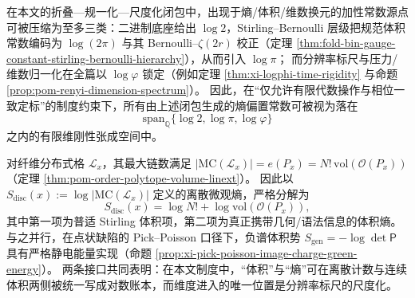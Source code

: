 \begin{remark}\label{rem:xi-constant-source-span-log2-pi-phi}
在本文的折叠—规一化—尺度化闭包中，出现于熵/体积/维数换元的加性常数源点可被压缩为至多三类：二进制底座给出 \(\log 2\)，Stirling--Bernoulli 层级把规范体积常数编码为 \(\log(2\pi)\) 与其 Bernoulli--\(\zeta(2r)\) 校正（定理 \ref{thm:fold-bin-gauge-constant-stirling-bernoulli-hierarchy}），从而引入 \(\log\pi\)；
而分辨率标尺与压力/维数归一化在全篇以 \(\log\varphi\) 锁定（例如定理 \ref{thm:xi-logphi-time-rigidity} 与命题 \ref{prop:pom-renyi-dimension-spectrum}）。
因此，在“仅允许有限代数操作与相位一致定标”的制度约束下，所有由上述闭包生成的熵偏置常数可被视为落在
\[
\mathrm{span}_{\mathbb Q}\{\log 2,\log\pi,\log\varphi\}
\]
之内的有限维刚性张成空间中。
\end{remark}

\begin{remark}\label{rem:xi-discrete-continuous-volume-entropy-splitting}
对纤维分布式格 \(\mathcal L_x\)，其最大链数满足
\(
|\mathrm{MC}(\mathcal L_x)|=e(P_x)=N!\,\mathrm{vol}(\mathcal O(P_x))
\)
（定理 \ref{thm:pom-order-polytope-volume-linext}）。
因此以
\(
S_{\mathrm{disc}}(x):=\log|\mathrm{MC}(\mathcal L_x)|
\)
定义的离散微观熵，严格分解为
\[
S_{\mathrm{disc}}(x)=\log N!+\log \mathrm{vol}(\mathcal O(P_x)),
\]
其中第一项为普适 Stirling 体积项，第二项为真正携带几何/语法信息的体积熵。
与之并行，在点状缺陷的 Pick--Poisson 口径下，负谱体积势
\(
S_{\mathrm{gen}}=-\log\det\mathsf P
\)
具有严格静电能量实现（命题 \ref{prop:xi-pick-poisson-image-charge-green-energy}）。
两条接口共同表明：在本文制度中，“体积”与“熵”可在离散计数与连续体积两侧被统一写成对数账本，而维度进入的唯一位置是分辨率标尺的尺度化。
\end{remark}

